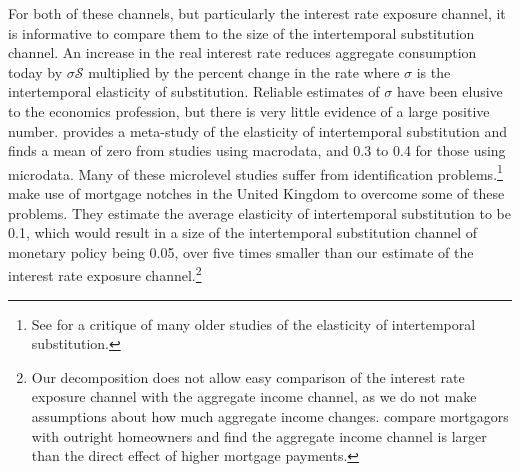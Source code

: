 \documentclass[titlepage]{\econtex}\newcommand{\texname}{ConsumptionHeterogeneity}
\begin{document}
For both of these channels, but particularly the interest rate exposure channel, it is informative to compare them to the size of the intertemporal substitution channel. An increase in the real interest rate reduces aggregate consumption today by $\sigma \mathcal{S}$ multiplied by the percent change in the rate where $\sigma$ is the intertemporal elasticity of substitution. Reliable estimates of $\sigma$ have been elusive to the economics profession, but there is very little evidence of a large positive number. \cite{havranek_measuring_2015} provides a meta-study of the elasticity of intertemporal substitution and finds a mean of zero from studies using macrodata, and 0.3 to 0.4 for those using microdata. Many of these microlevel studies suffer from identification problems.\footnote{See \cite{carroll_death_2001} for a critique of many older studies of the elasticity of intertemporal substitution.} \cite{best_estimating_2018} make use of mortgage notches in the United Kingdom to overcome some of these problems. They estimate the average elasticity of intertemporal substitution to be 0.1, which would result in a size of the intertemporal substitution channel of monetary policy being 0.05, over five times smaller than our estimate of the interest rate exposure channel.\footnote{Our decomposition does not allow easy comparison of the interest rate exposure channel with the aggregate income channel, as we do not make assumptions about how much aggregate income changes. \cite{cloyne_monetary_2016} compare mortgagors with outright homeowners and find the aggregate income channel is larger than the direct effect of higher mortgage payments.}
\begin{center}
	\label{table:suff_stats}
	
\end{center}
\end{document}
